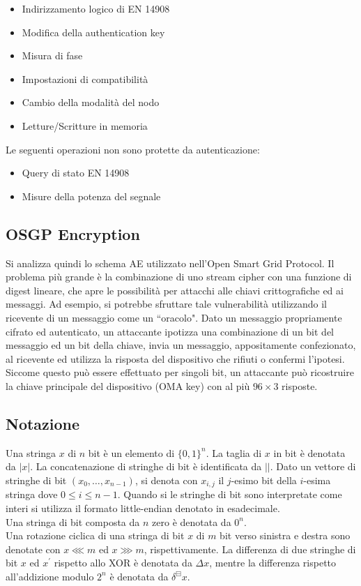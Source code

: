 \begin{itemize}
	\item Indirizzamento logico di EN 14908
	\item Modifica della authentication key
	\item Misura di fase
	\item Impostazioni di compatibilità
	\item Cambio della modalità del nodo
	\item Letture/Scritture in memoria
\end{itemize}
Le seguenti operazioni non sono protette da autenticazione:
\begin{itemize}
	\item Query di stato EN 14908
	\item Misure della potenza del segnale
\end{itemize}
\subsection{OSGP Encryption}
Si analizza quindi lo schema AE utilizzato nell'Open Smart Grid Protocol.
Il problema più grande è la combinazione di uno stream cipher con una funzione di digest lineare, che apre le possibilità per attacchi alle chiavi crittografiche ed ai messaggi. Ad esempio, si potrebbe sfruttare tale vulnerabilità utilizzando il ricevente di un messaggio come un ``oracolo". Dato un messaggio propriamente cifrato ed autenticato, un attaccante ipotizza una combinazione di un bit del messaggio ed un bit della chiave, invia un messaggio, appositamente confezionato, al ricevente ed utilizza la risposta del  dispositivo che rifiuti o confermi l'ipotesi. Siccome questo può essere effettuato per singoli bit, un attaccante può ricostruire la chiave principale del dispositivo (OMA key) con al più $96 \times 3$ risposte.
\subsection{Notazione}
Una stringa $x$ di $n$ bit è un elemento di $\{0,1\}^n$. La taglia di $x$ in bit è denotata da $|x|$. La concatenazione di stringhe di bit è identificata da $||$. Dato un vettore di stringhe di bit $(x_0, \ldots, x_{n-1})$, si denota con $x_{i,j}$ il $j$-esimo bit della $i$-esima stringa dove $0 \leq i \leq n-1$. Quando si le stringhe di bit sono interpretate come interi si utilizza il formato little-endian denotato in esadecimale.\\
Una stringa di bit composta da $n$ zero è denotata da $0^n$.\\
Una rotazione ciclica di una stringa di bit $x$ di $m$ bit verso sinistra e destra sono denotate con $x \lll m$ ed $x \ggg m$, rispettivamente. La differenza di due stringhe di bit $x$ ed $x^\prime$ rispetto allo XOR è denotata da $\Delta x$, mentre la differenza rispetto all'addizione modulo $2^n$ è denotata da $\delta^{\boxminus}x$.
